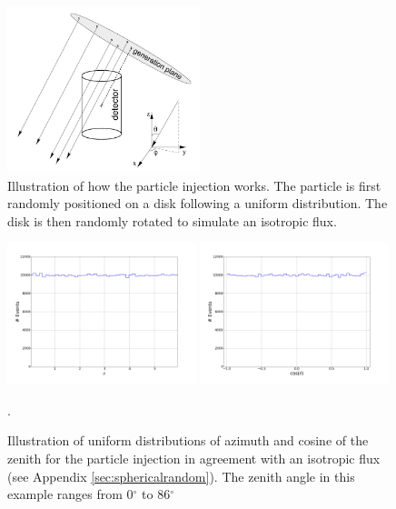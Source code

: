 \begin{figure}[t]
\centering
\includegraphics[width=0.5\textwidth]{chapter6/img/GenerationDisk.png}
\caption{Illustration of how the particle injection works. The particle is first randomly positioned on a disk following a uniform distribution. The disk is then randomly rotated to simulate an isotropic flux.}
\label{fig:injector}
\end{figure}

\begin{figure}[t]
\centering
\includegraphics[width=0.49\textwidth]{chapter6/img/Azimuth}
\includegraphics[width=0.49\textwidth]{chapter6/img/Zenith_full}
\caption{Illustration of uniform distributions of azimuth and cosine of the zenith for the particle injection in agreement with an isotropic flux (see Appendix \ref{sec:sphericalrandom}). The zenith angle in this example ranges from 0$^\circ$ to 86$^\circ$ }.
\label{fig:angles}
\end{figure}


